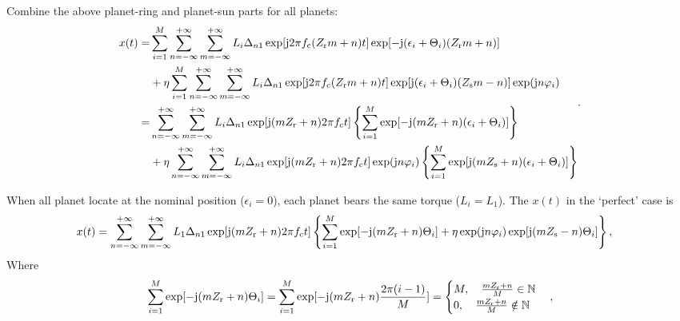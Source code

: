 \documentclass[a4paper,fleqn]{cas-sc}%
\begin{document}
Combine the above planet-ring and planet-sun parts for all planets:
\begin{equation}
    \begin{split}
    x(t)=&\sum_{i=1}^{M} \sum_{n=-\infty}^{+\infty} \sum_{m=-\infty}^{+\infty} L_i \Delta_{n 1} \exp[{\rm j} 2 \pi f_{\rm c} (Z_{\rm r} m +n) t] \exp[-{\rm j} (\epsilon_i+\Theta_i) (Z_{\rm r} m +n)]\\%
    &+ \eta \sum_{i=1}^{M}  \sum_{n=-\infty}^{+\infty} \sum_{m=-\infty}^{+\infty} L_i \Delta_{n 1} \exp[{\rm j} 2 \pi f_{\rm c} (Z_{\rm r} m +n) t] \exp[{\rm j} (\epsilon_i+\Theta_i) (Z_{\rm s} m -n)] \exp({\rm j} n \varphi_i)\\%
     =&\sum_{n=-\infty}^{+\infty} \sum_{m=-\infty}^{+\infty} L_i \Delta_{n 1} \exp[{\rm j}(m Z_{\rm r} + n) 2 \pi f_{\rm c} t] \left\{ \sum_{i=1}^{M} \exp[-{\rm j} (m Z_{\rm r} + n)(\epsilon_i+\Theta_i)]\right\}\\%
    &+ \eta \sum_{n=-\infty}^{+\infty} \sum_{m=-\infty}^{+\infty} L_i \Delta_{n 1}\exp[{\rm j} (m Z_{\rm r} + n) 2 \pi f_{\rm c} t] \exp({\rm j} n \varphi_i) \left\{ \sum_{i=1}^{M} \exp[{\rm j} (m Z_{\rm s} + n)(\epsilon_i+\Theta_i)] \right\}
    \end{split}.
\end{equation}
\par When all planet locate at the nominal position ($\epsilon_i=0$), each planet bears the same torque ($L_i=L_1$). The $x(t)$ in the `perfect' case is
\begin{equation}
    \begin{split}
        x(t)&=\sum_{n=-\infty}^{+\infty} \sum_{m=-\infty}^{+\infty} L_1 \Delta_{n 1} \exp[{\rm j}(m Z_{\rm r} + n) 2 \pi f_{\rm c} t] \left\{ \sum_{i=1}^{M} \exp[-{\rm j} (m Z_{\rm r} + n)\Theta_i]%
        + \eta \exp({\rm j}n\varphi_i) \exp[{\rm j}(m Z_{\rm s}-n)\Theta_i]\right\},%
    \end{split}
\end{equation}
Where
\begin{equation}
        \sum_{i=1}^{M} \exp[-{\rm j} (m Z_{\rm r} + n)\Theta_i]=\sum_{i=1}^{M} \exp[-{\rm j}(m Z_{\rm r}+n)\frac{2 \pi (i-1)}{M}]=\begin{cases}
            M, \quad \frac{m Z_{\rm r}+n}{M} \in \mathbb{N}\\
            0, \quad \frac{m Z_{\rm r}+n}{M} \notin \mathbb{N}
        \end{cases},\label{eq:carrier_harmonic_ring}
\end{equation}
\end{document}
